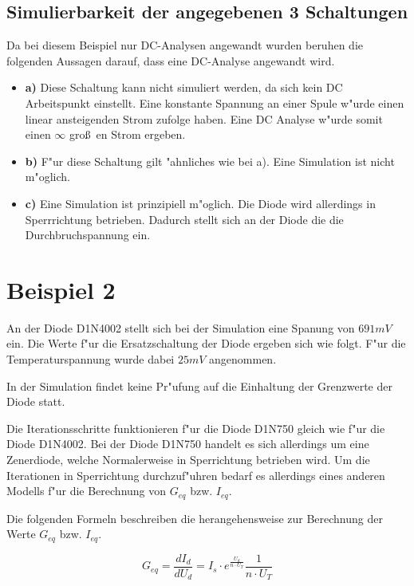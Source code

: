 \subsection{Simulierbarkeit der angegebenen 3 Schaltungen}

Da bei diesem Beispiel nur DC-Analysen angewandt wurden beruhen die folgenden Aussagen darauf, dass eine DC-Analyse angewandt wird.

\begin{itemize}
 \item \textbf{a)} Diese Schaltung kann nicht simuliert werden, da sich kein DC Arbeitspunkt einstellt.
 Eine konstante Spannung an einer Spule w"urde einen linear ansteigenden Strom zufolge haben.
Eine DC Analyse w"urde somit einen $\infty$ gro\ss~en Strom ergeben.
 \item \textbf{b)} F"ur diese Schaltung gilt "ahnliches wie bei a). Eine Simulation ist nicht m"oglich.
 \item \textbf{c)} Eine Simulation ist prinzipiell m"oglich. Die Diode wird allerdings in Sperrrichtung betrieben.
 Dadurch stellt sich an der Diode die die Durchbruchspannung ein.
\end{itemize}



\section{Beispiel 2}


An der Diode D1N4002 stellt sich bei der Simulation eine Spanung von $691mV$ ein.
Die Werte f"ur die Ersatzschaltung der Diode ergeben sich wie folgt.
F"ur die Temperaturspannung wurde dabei $25mV$ angenommen.

In der Simulation findet keine Pr"ufung auf die Einhaltung der Grenzwerte der Diode statt.

Die Iterationsschritte funktionieren f"ur die Diode D1N750 gleich wie f"ur die Diode D1N4002.
Bei der Diode D1N750 handelt es sich allerdings um eine Zenerdiode, welche Normalerweise in
Sperrichtung betrieben wird. Um die Iterationen in Sperrichtung durchzuf"uhren bedarf es allerdings
eines anderen Modells f"ur die Berechnung von $G_{eq}$ bzw. $I_{eq}$.

Die folgenden Formeln beschreiben die herangehensweise zur Berechnung der Werte $G_{eq}$ bzw. $I_{eq}$.

\begin{equation}
 G_{eq} = \frac{d I_d}{d U_d} = I_s \cdot e^{\frac{U_d}{n \cdot U_T}} \frac{1}{n \cdot U_T}
\end{equation}

